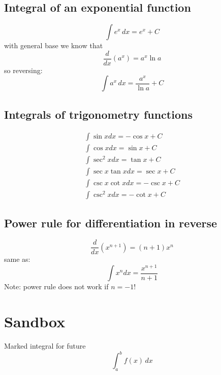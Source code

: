 \documentclass{article}
\begin{document}
\subsection{Integral of an exponential function}
\begin{equation}
  \int e^x \, dx = e^x + C
\end{equation}
with general base we know that
\begin{equation}
  \frac{d}{dx} (a^x) = a^x \ln a
\end{equation}
so reversing:
\begin{equation}
  \int a^x \, dx = \frac{a^x}{\ln a} + C
\end{equation}

\subsection{Integrals of trigonometry functions}
\begin{equation}
  \begin{gathered}
    \int \sin x dx = -\cos x + C \\
    \int \cos x dx = \sin x + C \\
    \int \sec^2 x dx = \tan x + C \\
    \int \sec x \tan x dx = \sec x + C \\
    \int \csc x \cot x dx = -\csc x + C \\
    \int \csc^2 x dx = -\cot x + C
  \end{gathered}
\end{equation}

\subsection{Power rule for differentiation in reverse}
\begin{equation}
  \frac{d}{dx}(x^{n+1}) = (n+1)x^n
\end{equation}
same as:
\begin{equation}
  \int x^ndx = \frac{x^{n+1}}{n+1}
\end{equation}
Note: power rule does not work if $n=-1$!

\section{Sandbox}
Marked integral for future
\begin{equation}
  \int_{a}^{b} f(x) \, dx
\end{equation}
\end{document}
